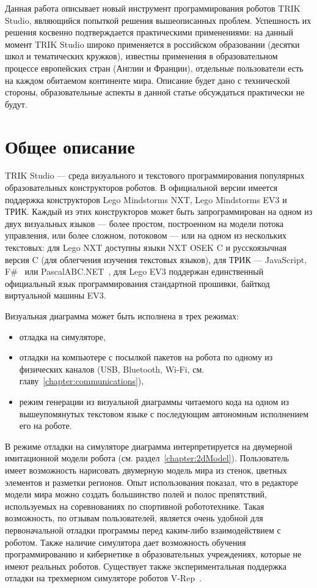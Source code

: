 \documentclass[a5paper]{article}
\begin{document}
Данная работа описывает новый инструмент программирования роботов TRIK Studio, являющийся попыткой решения вышеописанных проблем. Успешность их решения косвенно подтверждается практическими применениями: на данный момент TRIK Studio широко применяется в российском образовании (десятки школ и тематических кружков), известны применения в образовательном процессе европейских стран (Англии и Франции), отдельные пользователи есть на каждом обитаемом континенте мира. Описание будет дано с технической стороны, образовательные аспекты в данной статье обсуждаться практически не будут.

\section{Общее описание}
\label{chapter:commonDescription}

TRIK Studio --- среда визуального и текстового программирования популярных образовательных конструкторов роботов. В официальной версии имеется поддержка конструкторов Lego Mindstorms NXT, Lego Mindstorms EV3 и ТРИК. Каждый из этих конструкторов может быть запрограммирован на одном из двух визуальных языков --- более простом, построенном на модели потока управления, или более сложном, потоковом --- или на одном из нескольких текстовых: для Lego NXT доступны языки NXT OSEK C и русскоязычная версия C (для облегчения изучения текстовых языков), для ТРИК --- JavaScript, F\#~\cite{kirsanov2014robotics} или PascalABC.NET~\cite{doliner2014basics}, для Lego EV3 поддержан единственный официальный язык программирования стандартной прошивки, байткод виртуальной машины EV3. 

Визуальная диаграмма может быть исполнена в трех режимах: 
\begin{itemize}
    \item отладка на симуляторе,
    \item отладки на компьютере с посылкой пакетов на робота по одному из физических каналов (USB, Bluetooth, Wi-Fi, см. главу~\ref{chapter:communications}),
    \item режим генерации из визуальной диаграммы читаемого кода на одном из вышеупомянутых текстовом языке с последующим автономным исполнением его на роботе. 
\end{itemize}

В режиме отладки на симуляторе диаграмма интерпретируется на двумерной имитационной модели робота (см. раздел~\ref{chapter:2dModel}). Пользователь имеет возможность нарисовать двумерную модель мира из стенок, цветных элементов и разметки регионов. Опыт использования показал, что в редакторе модели мира можно создать большинство полей и полос препятствий, используемых на соревнованиях по спортивной робототехнике. Такая возможность, по отзывам пользователей, является очень удобной для первоначальной отладки программы перед каким-либо взаимодействием с роботом. Также наличие симулятора дает возможность обучения программированию и кибернетике в образовательных учреждениях, которые не имеют реальных роботов. Существует также экспериментальная поддержка отладки на трехмерном симуляторе роботов V-Rep~\cite{rohmer2013v}.
\end{document}
